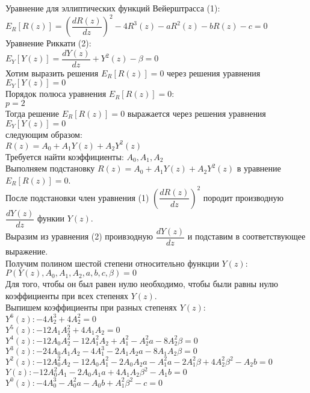 \documentclass[12pt,a4paper,draft]{letter}
\begin{document}
\onehalfspacing
Уравнение для эллиптических функций Вейерштрасса (1):
\\
$E_R [R(z)] = \left(\dfrac{dR(z)}{dz}\right)^2 - 4R^3(z) - aR^2(z) - bR(z) - c = 0$
\\
Уравнение Риккати (2):
\\
$E_Y [Y(z)] = \dfrac{dY(z)}{dz} + Y^2(z) - \beta = 0$
\\
Хотим выразить решения $E_R [R(z)] = 0$ через решения уравнения $E_Y [Y(z)] = 0$
\\
Порядок полюса уравнения $E_R [R(z)] = 0$:
\\
$p = 2$
\\
Тогда решение $E_R [R(z)] = 0$ выражается через решения уравнения $E_Y [Y(z)] = 0$
\\
следующим образом:
\\
$R(z) = A_0 + A_1 Y(z) + A_2 Y^2(z)$
\\
Требуется найти коэффициенты: $A_0, A_1, A_2$
\\
Выполняем подстановку $R(z) = A_0 + A_1 Y(z) + A_2 Y^2(z)$ в уравнение $E_R [R(z)] = 0$.
\\
После подстановки член уравнения (1) $\left(\dfrac{dR(z)}{dz}\right)^2$ породит производную $ \dfrac{dY(z)}{dz}$ функии $Y(z)$.
\\
Выразим из уравнения (2) проивзодную $ \dfrac{dY(z)}{dz}$ и подставим в соответствующее выражение.
\\
Получим полином шестой степени относительно функции $Y(z)$:
\\
$P(Y(z), A_0, A_1, A_2, a, b, c, \beta) = 0$
\\
Для того, чтобы он был равен нулю необходимо, чтобы были равны нулю коэффициенты при всех степенях $Y(z)$.
\\
Выпишем коэффициенты при разных степенях $Y(z)$:
\\
$Y^6(z): -4A_2^3 + 4A_2^2 = 0$ \\
$Y^5(z): -12A_1 A_2^2 + 4A_1 A_2 = 0$ \\
$Y^4(z): -12 A_0 A_2^2 - 12 A_1^2 A_2 + A_1^2 - A_2^2 a - 8 A_2^2 \beta = 0$ \\
$Y^3(z):  -24 A_0 A_1 A_2 - 4 A_1^3 - 2 A_1 A_2 a - 8 A_1 A_2 \beta = 0$ \\
$Y^2(z):  -12 A_0^2 A_2 - 12 A_0 A_1^2 - 2 A_0 A_2 a - A_1^2 a - 2 A_1^2 \beta + 4 A_2^2 \beta^2 - A_2 b = 0$ \\
$Y(z):  -12 A_0^2 A_1 - 2 A_0 A_1 a + 4 A_1 A_2 \beta^2 - A_1 b = 0$ \\
$Y^0(z):  -4 A_0^3 - A_0^2 a - A_0 b + A_1^2 \beta^2 - c = 0$ \\
\end{document}
